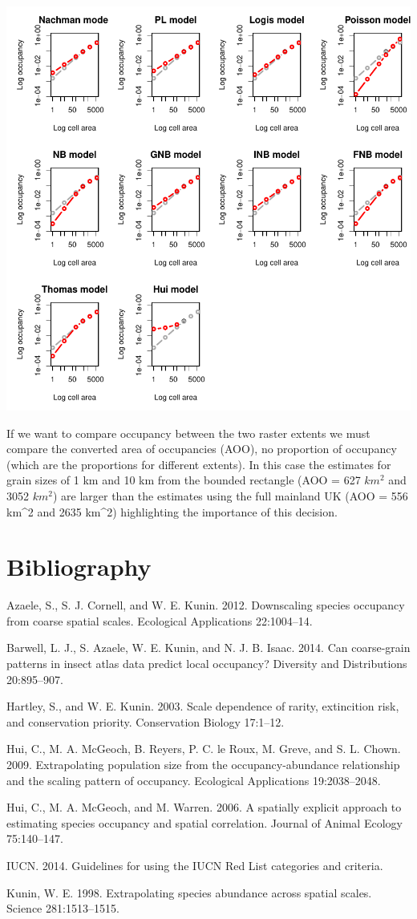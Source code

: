 \documentclass{article}[12pt, a4paper]
\begin{document}
\includegraphics{Downscaling-downscale42}

If we want to compare occupancy between the two raster extents we must compare the converted area of occupancies (AOO), no proportion of occupancy (which are the proportions for different extents). In this case the estimates for grain sizes of 1 km and 10 km from the bounded rectangle (AOO = 627 $km^{2}$ and 3052 $km^{2}$) are larger than the estimates using the full mainland UK (AOO = 556 km^{2} and 2635 km^{2}) highlighting the importance of this decision.

\section{Bibliography}

Azaele, S., S. J. Cornell, and W. E. Kunin. 2012. Downscaling species occupancy from coarse spatial scales. Ecological Applications 22:1004–14.

Barwell, L. J., S. Azaele, W. E. Kunin, and N. J. B. Isaac. 2014. Can coarse-grain patterns in insect atlas data predict local occupancy? Diversity and Distributions 20:895–907.

Hartley, S., and W. E. Kunin. 2003. Scale dependence of rarity, extincition risk, and conservation priority. Conservation Biology 17:1–12.

Hui, C., M. A. McGeoch, B. Reyers, P. C. le Roux, M. Greve, and S. L. Chown. 2009. Extrapolating population size from the occupancy-abundance relationship and the scaling pattern of occupancy. Ecological Applications 19:2038–2048.

Hui, C., M. A. McGeoch, and M. Warren. 2006. A spatially explicit approach to estimating species occupancy and spatial correlation. Journal of Animal Ecology 75:140–147.

IUCN. 2014. Guidelines for using the IUCN Red List categories and criteria.

Kunin, W. E. 1998. Extrapolating species abundance across spatial scales. Science 281:1513–1515.
\end{document}
